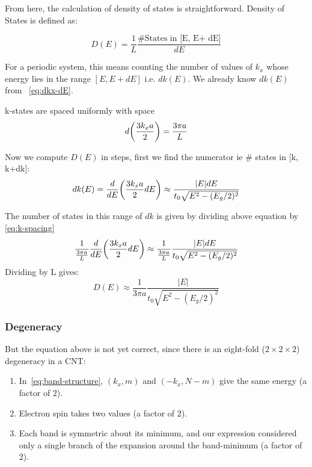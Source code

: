 \documentclass{article}
\begin{document}
From here, the calculation of density of states is 
straightforward. Density of States is defined as:

\begin{equation}
    D(E) = \frac{1}{L}\frac{ \text{\# States in [E, E+ dE]}}{dE}
\end{equation}

For a periodic system, this means counting the number of values of $k_x$ whose energy lies in the 
range $[E, E+dE]$ i.e. $dk(E)$. We already know $dk(E)$ from ~\eqref{eq:dkx-dE}.

k-states are spaced uniformly with space 
\begin{equation}\label{eq:k-spacing}
    d \bigg{(}\frac{3k_x a}{2}\bigg{)} = \frac{3\pi a}{L}
\end{equation}

Now we compute $D(E)$ in steps, first we find the numerator ie \# states in [k, k+dk]:
\begin{equation}
    dk(E) = \frac{d}{dE} \bigg{(}\frac{3k_x a}{2}dE \bigg{)} \approx \frac{|E|dE}{t_0\sqrt{E^2-(E_g/2)^2}}
\end{equation}

The number of states in this range of $dk$ is given by dividing above equation by \ref{eq:k-spacing}
\begin{equation}
     \frac{1}{ \frac{3\pi a}{L}}\frac{d}{dE} \bigg{(}\frac{3k_x a}{2}dE \bigg{)} \approx \frac{1}{ \frac{3\pi a}{L}}\frac{|E|dE}{t_0\sqrt{E^2-(E_g/2)^2}}
\end{equation}
Dividing by L gives:
\begin{equation}
     D(E) \approx \frac{1}{3\pi a}\frac{|E|}{t_0\sqrt{E^2-(E_g/2)^2}}
\end{equation}

\subsubsection{Degeneracy}

But the equation above is not yet correct, since there is an eight-fold ($2 \times 2 \times 2$) degeneracy in a CNT:
\begin{enumerate}
    \item In~\eqref{eq:band-structure}, $(k_x, m)$ and $(-k_x, N-m)$ give the same energy (a factor of $2$).
    \item Electron spin takes two values (a factor of $2$).
    \item Each band is symmetric about its minimum, and our expression considered only a single branch of the expansion around the band-minimum (a factor of $2$).
\end{enumerate}
\end{document}

